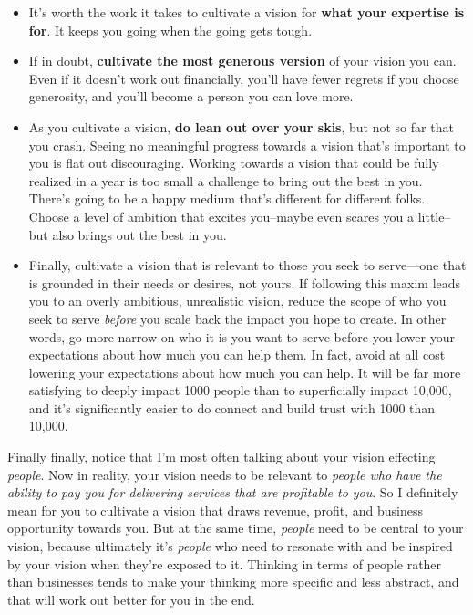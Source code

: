 \begin{itemize}
\item It's worth the work it takes to cultivate a vision for \textbf{what your expertise is for}. It keeps you going when the going gets tough.
\item If in doubt, \textbf{cultivate the most generous version} of your vision you can. Even if it doesn't work out financially, you'll have fewer regrets if you choose generosity, and you’ll become a person you can love more.
\item As you cultivate a vision, \textbf{do lean out over your skis}, but not so far that you crash. Seeing no meaningful progress towards a vision that's important to you is flat out discouraging. Working towards a vision that could be fully realized in a year is too small a challenge to bring out the best in you. There's going to be a happy medium that's different for different folks. Choose a level of ambition that excites you--maybe even scares you a little--but also brings out the best in you.
\item Finally, cultivate a vision that is relevant to those you seek to serve—one that is grounded in their needs or desires, not yours. If following this maxim leads you to an overly ambitious, unrealistic vision, reduce the scope of who you seek to serve \emph{before} you scale back the impact you hope to create. In other words, go more narrow on who it is you want to serve before you lower your expectations about how much you can help them. In fact, avoid at all cost lowering your expectations about how much you can help. It will be far more satisfying to deeply impact 1000 people than to superficially impact 10,000, and it's significantly easier to do connect and build trust with 1000 than 10,000.
\end{itemize}

Finally finally, notice that I'm most often talking about your vision effecting \emph{people}. Now in reality, your vision needs to be relevant to \emph{people who have the ability to pay you for delivering services that are profitable to you}. So I definitely mean for you to cultivate a vision that draws revenue, profit, and business opportunity towards you. But at the same time, \emph{people} need to be central to your vision, because ultimately it's \emph{people} who need to resonate with and be inspired by your vision when they're exposed to it. Thinking in terms of people rather than businesses tends to make your thinking more specific and less abstract, and that will work out better for you in the end.

